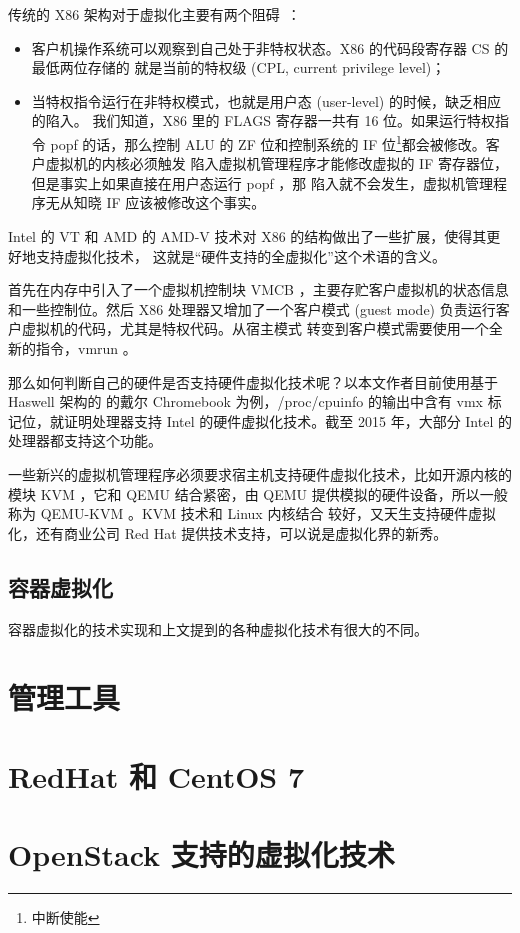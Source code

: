
传统的 X86 架构对于虚拟化主要有两个阻碍~\cite{adams2006comparison}：

\begin{itemize}
    \item 客户机操作系统可以观察到自己处于非特权状态。X86 的代码段寄存器 CS 的最低两位存储的
    就是当前的特权级 (CPL, current privilege level)；
    \item 当特权指令运行在非特权模式，也就是用户态 (user-level) 的时候，缺乏相应的陷入。
    我们知道，X86 里的 FLAGS 寄存器一共有 16 位。如果运行特权指令 popf 的话，那么控制
    ALU 的 ZF 位和控制系统的 IF 位\footnote{中断使能}都会被修改。客户虚拟机的内核必须触发
    陷入虚拟机管理程序才能修改虚拟的 IF 寄存器位，但是事实上如果直接在用户态运行 popf ，那
    陷入就不会发生，虚拟机管理程序无从知晓 IF 应该被修改这个事实。
\end{itemize}

Intel 的 VT 和 AMD 的 AMD-V 技术对 X86 的结构做出了一些扩展，使得其更好地支持虚拟化技术，
这就是“硬件支持的全虚拟化”这个术语的含义。

首先在内存中引入了一个虚拟机控制块 VMCB ，主要存贮客户虚拟机的状态信息和一些控制位。然后 X86
处理器又增加了一个客户模式 (guest mode) 负责运行客户虚拟机的代码，尤其是特权代码。从宿主模式
转变到客户模式需要使用一个全新的指令，vmrun 。

那么如何判断自己的硬件是否支持硬件虚拟化技术呢？以本文作者目前使用基于 Haswell 架构的
的戴尔 Chromebook 为例，/proc/cpuinfo 的输出中含有 vmx 标记位，就证明处理器支持
 Intel 的硬件虚拟化技术。截至 2015 年，大部分 Intel 的处理器都支持这个功能。


一些新兴的虚拟机管理程序必须要求宿主机支持硬件虚拟化技术，比如开源内核的模块 KVM ，它和 QEMU
结合紧密，由 QEMU 提供模拟的硬件设备，所以一般称为 QEMU-KVM 。KVM 技术和 Linux 内核结合
较好，又天生支持硬件虚拟化，还有商业公司 Red Hat 提供技术支持，可以说是虚拟化界的新秀。

\subsection{容器虚拟化}

容器虚拟化的技术实现和上文提到的各种虚拟化技术有很大的不同。

\section{管理工具}

\section{RedHat 和 CentOS 7}

\section{OpenStack 支持的虚拟化技术}

